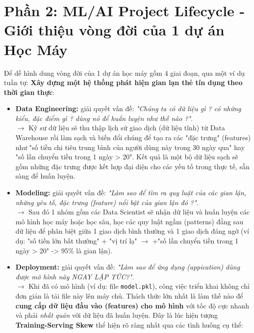 \documentclass[11pt]{article}
\begin{document}
\section{Phần 2: ML/AI Project Lifecycle - Giới thiệu vòng đời của 1 dự án Học Máy}
Để dễ hình dung vòng đời của 1 dự án học máy gồm 4 giai đoạn, qua một ví dụ tuần tự: \textbf{Xây dựng một hệ thống phát hiện gian lạn thẻ tín dụng theo thời gian thực}:
\begin{itemize}
	\item \textbf{Data Engineering:} giải quyết vấn đề: \textit{"Chúng ta có dữ liệu gì ? có những kiểu, đặc điểm gì ? dùng nó để huấn luyện như thế nào ?"}. \\
 	  $\rightarrow$ Kỹ sư dữ liệu sẽ thu thập lịch sử giao dịch (dữ liệu tĩnh) từ Data Warehouse rồi làm sạch và biến đổi chúng để tạo ra các "đặc trưng" (features) như "số tiền chi tiêu trung bình của người dùng này trong 30 ngày qua" hay "số lần chuyển tiền trong 1 ngày > 20". Kết quả là một bộ dữ liệu sạch sẽ gồm những đặc trưng được kết hợp đại diện cho các yếu tố trong thực tế, sẵn sàng để huấn luyện.

	\item \textbf{Modeling:} giải quyết vấn đề: \textit{"Làm sao để tìm ra quy luật của các gian lận, những yêu tố, đặc trưng (feature) nổi bật của gian lận đó ?"}. \\
	 $\rightarrow$ Sau đó 1 nhóm gồm các Data Scientist sẽ nhận dữ liệu và huấn luyện các mô hình học máy hoặc học sâu, học các quy luật ngầm (patterns) đằng sau dữ liệu để phân biệt giữa 1 giao dịch bình thường và 1 giao dịch đáng ngờ (ví dụ: "số tiền lớn bất thường" + "vị trí lạ" $\rightarrow$ +"số lần chuyển tiền trong 1 ngày > 20" -> 95\% là gian lận).

	\item \textbf{Deployment:} giải quyết vấn đề: \textit{"Làm sao để ứng dụng (appication) dùng được mô hình này NGAY LẬP TỨC?"}. \\
	 $\rightarrow$ Khi đã có mô hình (ví dụ: file \texttt{model.pkl}), công việc triển khai không chỉ đơn giản là tải file này lên máy chủ. Thách thức lớn nhất là làm thế nào để \textbf{cung cấp dữ liệu đầu vào (features) cho mô hình} với tốc độ cực nhanh và phải \textit{nhất quán} với dữ liệu đã huấn luyện.
	Đây là lúc hiện tượng \textbf{Training-Serving Skew} thể hiện rõ ràng nhất qua các tình huống cụ thể:
	

\end{itemize}
\end{document}
